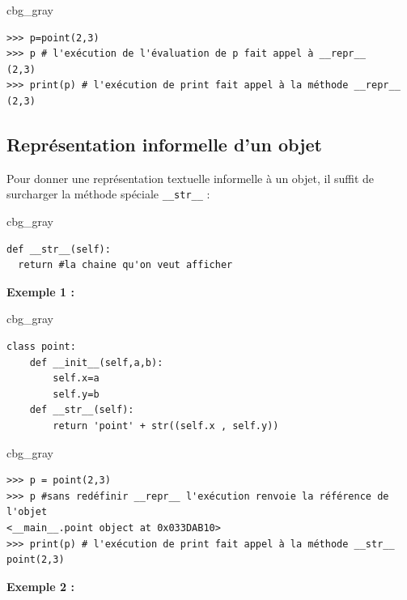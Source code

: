 \documentclass[%
oneside,                 %
final,                   %
10pt]{article}
\newenvironment{_cod_tight}[1]{
   \def\FrameCommand{\colorbox{#1}}
   \FrameRule0.6pt\MakeFramed {\FrameRestore}\vskip3mm}
   {\vskip0mm\endMakeFramed}
\newenvironment{cod}[1]{
\bgroup\rmfamily
\fboxsep=0mm\relax
\begin{_cod_tight}{#1}
\list{}{\parsep=-2mm\parskip=0mm\topsep=0pt\leftmargin=2mm
\rightmargin=2\leftmargin\leftmargin=4pt\relax}
\item\relax}
{\endlist\end{_cod_tight}\egroup}
\begin{document}
\begin{cod}{cbg_gray}\begin{verbatim}
>>> p=point(2,3)
>>> p # l'exécution de l'évaluation de p fait appel à __repr__
(2,3)
>>> print(p) # l'exécution de print fait appel à la méthode __repr__
(2,3)
\end{verbatim}
\end{cod}
\noindent

\subsection{Représentation informelle d'un objet}

Pour donner une représentation textuelle informelle à un objet, il suffit de surcharger la méthode spéciale \Verb!__str__! :
\begin{cod}{cbg_gray}\begin{verbatim}
def __str__(self):
  return #la chaine qu'on veut afficher
\end{verbatim}
\end{cod}
\noindent

\textbf{Exemple 1 :}

\begin{cod}{cbg_gray}\begin{verbatim}
class point:
    def __init__(self,a,b):
        self.x=a
        self.y=b
    def __str__(self):
        return 'point' + str((self.x , self.y))
\end{verbatim}
\end{cod}
\noindent

\begin{cod}{cbg_gray}\begin{verbatim}
>>> p = point(2,3)
>>> p #sans redéfinir __repr__ l'exécution renvoie la référence de l'objet
<__main__.point object at 0x033DAB10>
>>> print(p) # l'exécution de print fait appel à la méthode __str__
point(2,3)
\end{verbatim}
\end{cod}
\noindent

\textbf{Exemple 2 :}
\end{document}
